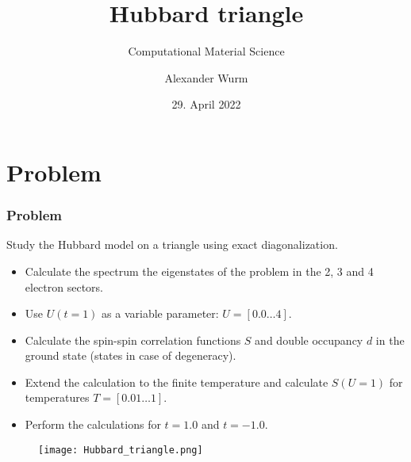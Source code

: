 \documentclass{beamer}
\title[Hubbard triangle]{Hubbard triangle}
\subtitle{Computational Material Science}
\author[A. Wurm]{Alexander Wurm}
\institute[]{Matr.Nr.: 11771212}
\date[29.04.2022]{29. April 2022}
\begin{document}
{ 
}
\addtocounter{framenumber}{-1}

\begin{frame}
\tableofcontents

\vfill
\end{frame}


\section{Problem}
\begin{frame}\frametitle{Problem}
Study the Hubbard model on a triangle using exact diagonalization.

\begin{itemize}
	\item Calculate the spectrum the eigenstates of the problem in the 2, 3 and 4 electron sectors. 
	\item Use $U(t=1)$ as a variable parameter: $U=\left[0.0 \ldots 4\right]$. 	
	\item Calculate the spin-spin correlation functions $S$ and double occupancy $d$ in the ground state (states in case of degeneracy).	
	\item Extend the calculation to the finite temperature and calculate $S(U=1)$ for temperatures $T= \left[0.01 \ldots 1\right]$. 
	\item Perform the calculations for $t=1.0$ and $t=-1.0$.
\end{itemize}

\begin{figure}[H]
	\centering
	\texttt{[image: Hubbard\_triangle.png]}
	\label{fig:hubbardtriangle}
\end{figure}	
\end{frame}
\end{document}
